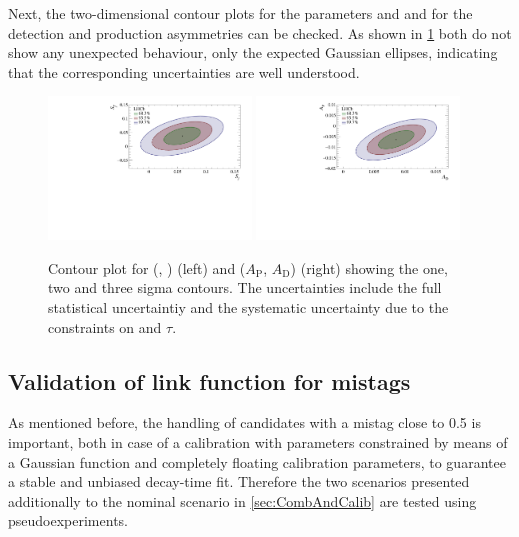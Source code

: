 Next, the two-dimensional contour plots for the \CP parameters \Sf and \Sfbar and for the detection and production asymmetries can be checked.
As shown in \cref{fig:corrPlots} both do not show any unexpected behaviour, only the expected Gaussian ellipses, indicating that the corresponding uncertainties are well understood.
\begin{figure}[tbp]
    \centering
    \includegraphics[width=0.48\textwidth]{09TimeFit/figs/SfvsSfbar.pdf}
    \includegraphics[width=0.48\textwidth]{09TimeFit/figs/ApvsAd.pdf}
    \caption{Contour plot for (\Sf, \Sfbar) (left) and ($A_{\text{P}}$, $A_{\text{D}}$) (right) showing the one, two and three sigma contours.
    The uncertainties include the full statistical uncertaintiy and the systematic uncertainty due to the constraints on \dm and $\tau$.}
    \label{fig:corrPlots}
\end{figure}

\subsection{Validation of link function for mistags}
\label{sec:ValLinkFunction}

As mentioned before, the handling of candidates with a mistag close to \num{0.5} is important, both in case of a calibration with parameters constrained by means of a Gaussian function and completely floating calibration parameters, to guarantee a stable and unbiased decay-time fit.
Therefore the two scenarios presented additionally to the nominal scenario in \cref{sec:CombAndCalib} are tested using pseudoexperiments.

